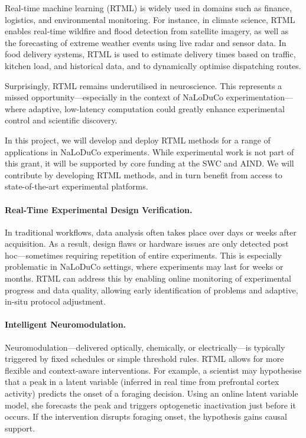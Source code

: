 \label{sec:rtmlNeuro}

Real-time machine learning (RTML) is widely used in domains such as finance, logistics, and environmental monitoring. For instance, in climate science, RTML enables real-time wildfire and flood detection from satellite imagery, as well as the forecasting of extreme weather events using live radar and sensor data. In food delivery systems, RTML is used to estimate delivery times based on traffic, kitchen load, and historical data, and to dynamically optimise dispatching routes.

Surprisingly, RTML remains underutilised in neuroscience. This represents a missed opportunity—especially in the context of NaLoDuCo experimentation—where adaptive, low-latency computation could greatly enhance experimental control and scientific discovery.

In this project, we will develop and deploy RTML methods for a range of applications in NaLoDuCo experiments. While experimental work is not part of this grant, it will be supported by core funding at the SWC and AIND. We will contribute by developing RTML methods, and in turn benefit from access to state-of-the-art experimental platforms.

\paragraph{Real-Time Experimental Design Verification.}
In traditional workflows, data analysis often takes place over days or weeks after acquisition. As a result, design flaws or hardware issues are only detected post hoc—sometimes requiring repetition of entire experiments. This is especially problematic in NaLoDuCo settings, where experiments may last for weeks or months. RTML can address this by enabling online monitoring of experimental progress and data quality, allowing early identification of problems and adaptive, in-situ protocol adjustment.

\paragraph{Intelligent Neuromodulation.}
Neuromodulation—delivered optically, chemically, or electrically—is typically triggered by fixed schedules or simple threshold rules. RTML allows for more flexible and context-aware interventions. For example, a scientist may hypothesise that a peak in a latent variable (inferred in real time from prefrontal cortex activity) predicts the onset of a foraging decision. Using an online latent variable model, she forecasts the peak and triggers optogenetic inactivation just before it occurs. If the intervention disrupts foraging onset, the hypothesis gains causal support.

